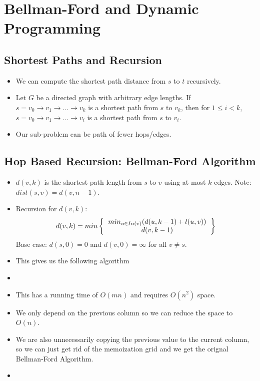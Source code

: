 \section{Bellman-Ford and Dynamic Programming}

\subsection{Shortest Paths and Recursion}
\begin{itemize}
    \item We can compute the shortest path distance from $s$ to $t$ recursively.
    \item Let $G$ be a directed graph with arbitrary edge lengths. If $s = v_0 \rightarrow v_1 \rightarrow ... \rightarrow v_k$ is a shortest path from $s$ to $v_k$, then for $1 \leq i < k$, $s = v_0 \rightarrow v_1 \rightarrow ... \rightarrow v_i$ is a shortest path from $s$ to $v_i$.
    \item Our sub-problem can be path of fewer hops/edges.
\end{itemize}

\subsection{Hop Based Recursion: Bellman-Ford Algorithm}
\begin{itemize}
    \item $d(v, k)$ is the shortest path length from $s$ to $v$ using at most $k$ edges. Note: $dist(s, v) = d(v, n - 1)$.
    \item Recursion for $d(v, k)$: \begin{equation}
        d(v, k) = min \left\{
            \begin{tabular}{c}
                $min_{u \in In(v)}(d(u, k - 1) + l(u, v))$ \\
                $d(v, k - 1)$ \\
            \end{tabular}
        \right\}
    \end{equation}
    Base case: $d(s, 0) = 0$ and $d(v, 0) = \infty$ for all $v \neq s$.
    \item This gives us the following algorithm
    \item[] 
    \item This has a running time of $O(mn)$ and requires $O(n^2)$ space.
    \item We only depend on the previous column so we can reduce the space to $O(n)$.
    \item We are also unnecessarily copying the previous value to the current column, so we can just get rid of the memoization grid and we get the orignal Bellman-Ford Algorithm.
    \item[] 
\end{itemize}

